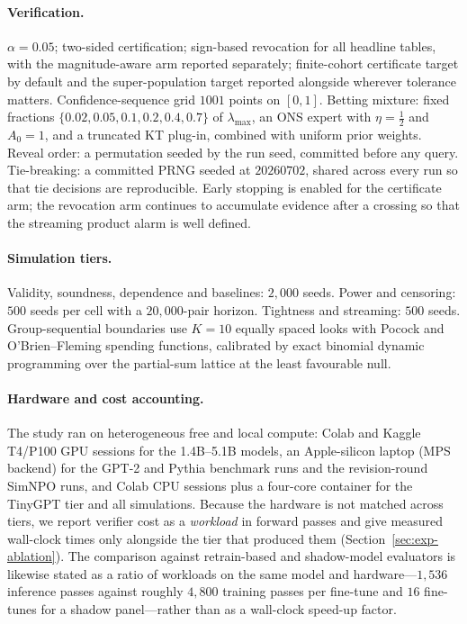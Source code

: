 \paragraph{Verification.} $\alpha = 0.05$; two-sided certification; sign-based
revocation for all headline tables, with the magnitude-aware arm reported separately;
finite-cohort certificate target by default and the super-population target reported
alongside wherever tolerance matters. Confidence-sequence grid $1001$ points on
$[0,1]$. Betting mixture: fixed fractions $\{0.02, 0.05, 0.1, 0.2, 0.4, 0.7\}$ of
$\lambda_{\max}$, an ONS expert with $\eta = \tfrac12$ and $A_0 = 1$, and a truncated
KT plug-in, combined with uniform prior weights. Reveal order: a permutation seeded by
the run seed, committed before any query. Tie-breaking: a committed PRNG seeded at
$20260702$, shared across every run so that tie decisions are reproducible.
Early stopping is enabled for the certificate arm; the revocation arm continues to
accumulate evidence after a crossing so that the streaming product alarm is
well defined.

\paragraph{Simulation tiers.} Validity, soundness, dependence and baselines: $2{,}000$
seeds. Power and censoring: $500$ seeds per cell with a $20{,}000$-pair horizon.
Tightness and streaming: $500$ seeds. Group-sequential boundaries use $K = 10$ equally
spaced looks with Pocock and O'Brien--Fleming spending functions, calibrated by exact
binomial dynamic programming over the partial-sum lattice at the least favourable
null.

\paragraph{Hardware and cost accounting.} The study ran on heterogeneous free and local
compute: Colab and Kaggle T4/P100 GPU sessions for the 1.4B--5.1B models, an
Apple-silicon laptop (MPS backend) for the GPT-2 and Pythia benchmark runs and the
revision-round SimNPO runs, and Colab CPU sessions plus a four-core container for the
TinyGPT tier and all simulations. Because the hardware is not matched across tiers, we
report verifier cost as a \emph{workload} in forward passes and give measured
wall-clock times only alongside the tier that produced them
(Section~\ref{sec:exp-ablation}). The comparison against retrain-based and
shadow-model evaluators is likewise stated as a ratio of workloads on the same model
and hardware---$1{,}536$ inference passes against roughly $4{,}800$ training passes per
fine-tune and $16$ fine-tunes for a shadow panel---rather than as a wall-clock
speed-up factor.
